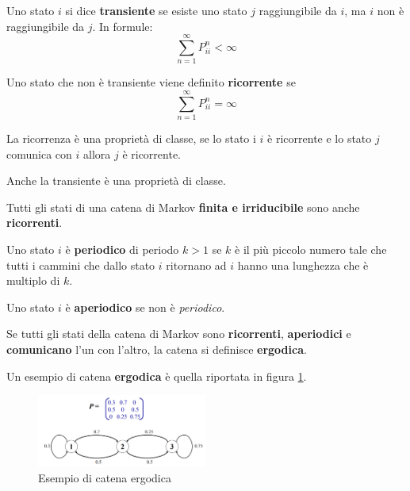 \begin{definizione}
    Uno stato $i$ si dice \textbf{transiente} se esiste uno stato $j$ raggiungibile
    da $i$, ma $i$ non è raggiungibile da $j$. In formule:
    \begin{equation*}
        \sum_{n=1}^{\infty} P_{ii}^n < \infty
    \end{equation*}
\end{definizione}
\begin{definizione}
    Uno stato che non è transiente viene definito \textbf{ricorrente} se
    \begin{equation*}
        \sum_{n=1}^{\infty} P_{ii}^n = \infty
    \end{equation*}
\end{definizione}
\begin{nota}
    La ricorrenza è una proprietà di classe, se lo stato i $i$ è ricorrente e
    lo stato $j$ comunica con $i$ allora $j$ è ricorrente.
\end{nota}
\begin{nota}
    Anche la transiente è una proprietà di classe.
\end{nota}
\begin{nota}
    Tutti gli stati di una catena di Markov \textbf{finita e irriducibile} sono
    anche \textbf{ricorrenti}.
\end{nota}
\begin{definizione}
    Uno stato $i$ è \textbf{periodico} di periodo $k > 1$ se $k$ è il più piccolo
    numero tale che tutti i cammini che dallo stato $i$ ritornano ad $i$ hanno una
    lunghezza che è multiplo di $k$.
\end{definizione}
\begin{definizione}
    Uno stato $i$ è \textbf{aperiodico} se non è \textit{periodico}.
\end{definizione}
\begin{definizione}
    Se tutti gli stati della catena di Markov sono \textbf{ricorrenti}, \textbf{aperiodici}
    e \textbf{comunicano} l'un con l'altro, la catena si definisce \textbf{ergodica}.
\end{definizione}
\begin{esempio}
    Un esempio di catena \textbf{ergodica} è quella riportata in figura \ref{fig:ergodic}.
    \begin{figure}[!ht]
        \centering
        \includegraphics[width=0.5\textwidth]{img/catene/catena_ergodica.png}
        \caption{Esempio di catena ergodica}
        \label{fig:ergodic}
    \end{figure}
\end{esempio}

